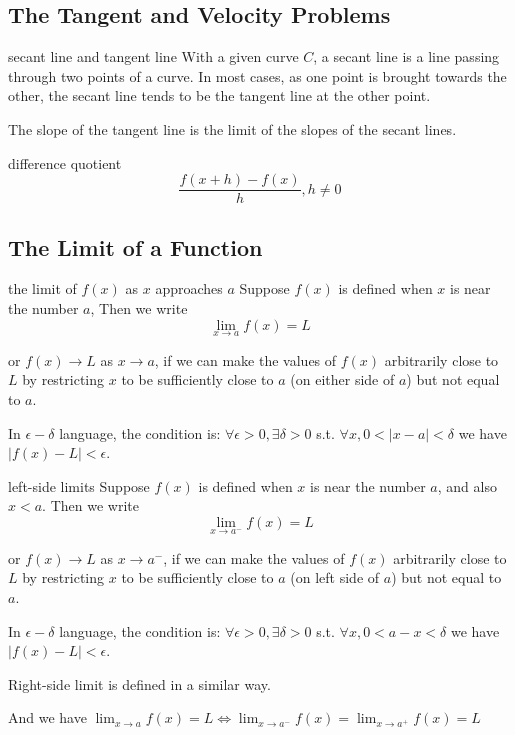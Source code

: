 \documentclass[Calculus 1 Recitation.tex]{subfiles}
\begin{document}
\subsection{The Tangent and Velocity Problems}

\begin{myleftlinebox}
	secant line and tangent line
	\tcblower
	With a given curve $C$, a secant line is a line passing through two points of a curve. In most cases, as one point is brought towards the other, the secant line tends to be the tangent line at the other point.

	The slope of the tangent line is the limit of the slopes of the secant
	lines.
\end{myleftlinebox}

\begin{myleftlinebox}
	difference quotient
	\tcblower
	\[\frac{f(x+h)-f(x)}{h}, h\neq0\]
\end{myleftlinebox}


\subsection{The Limit of a Function}

\begin{myleftlinebox}
	the limit of $f(x)$ as $x$ approaches $a$
	\tcblower
	Suppose $f(x)$ is defined when $x$ is near the number $a$, Then we write
	\[\lim_{x\to a}f(x)=L\]

	or \(f(x)\to L\) as $x\to a$, if we can make the values of $f(x)$ arbitrarily close to $L$ 	by restricting $x$ to be sufficiently close to $a$ (on either side of $a$) but not equal to $a$. 

	In $\epsilon-\delta$ language, the condition is: $\forall \epsilon > 0, \exists \delta > 0$ s.t. $\forall x, 0 < |x - a| < \delta$ we have $|f(x) - L| < \epsilon$.
\end{myleftlinebox}

\begin{myleftlinebox}
	left-side limits
	\tcblower
	Suppose $f(x)$ is defined when $x$ is near the number $a$, and also $x<a$. Then we write
	\[\lim_{x\to a^-}f(x)=L\]

	or \(f(x)\to L\) as $x\to a^-$, if we can make the values of $f(x)$ arbitrarily close to $L$ by restricting $x$ to be sufficiently close to $a$ (on left side of $a$) but not equal to $a$. 

	In $\epsilon-\delta$ language, the condition is: $\forall \epsilon > 0, \exists \delta > 0$ s.t. $\forall x, 0 < a-x < \delta$ we have $|f(x) - L| < \epsilon$.

	Right-side limit is defined in a similar way. 

	And we have $\lim_{x\to a}f(x)=L \iff \lim_{x\to a^-}f(x)=\lim_{x\to a^+}f(x)=L$
\end{myleftlinebox}
\end{document}
